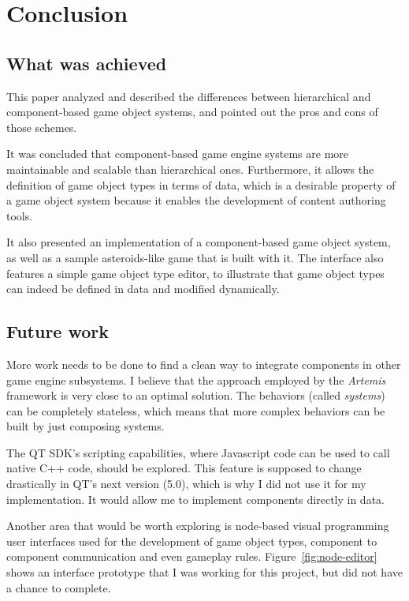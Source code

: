 \documentclass[
    phd,
    electronic,
    letterpaper,
    simplechapterheading,
    openany,
    parttop,
    lof,
]{byumsphd}
\begin{document}
\chapter{Conclusion}

\section{What was achieved}

This paper analyzed and described the differences between hierarchical and component-based game object systems, and pointed out the pros and cons of those schemes.

It was concluded that component-based game engine systems are more maintainable and scalable than hierarchical ones. Furthermore, it allows the definition of game object types in terms of data, which is a desirable property of a game object system because it enables the development of content authoring tools.

It also presented an implementation of a component-based game object system, as well as a sample asteroids-like game that is built with it. The interface also features a simple game object type editor, to illustrate that game object types can indeed be defined in data and modified dynamically.


\section{Future work}

More work needs to be done to find a clean way to integrate components in other game engine subsystems. I believe that the approach employed by the \textit{Artemis} framework is very close to an optimal solution. The behaviors (called \textit{systems}) can be completely stateless, which means that more complex behaviors can be built by just composing systems.

The QT SDK's scripting capabilities, where Javascript code can be used to call native C++ code, should be explored. This feature is supposed to change drastically in QT's next version (5.0), which is why I did not use it for my implementation. It would allow me to implement components directly in data.

Another area that would be worth exploring is node-based visual programming user interfaces used for the development of game object types, component to component communication and even gameplay rules. Figure~\ref{fig:node-editor} shows an interface prototype that I was working for this project, but did not have a chance to complete.
\end{document}
